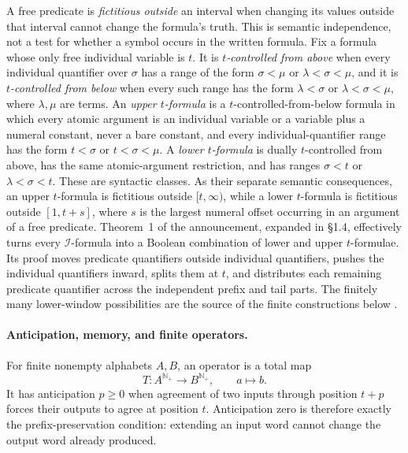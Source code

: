 A free predicate is \emph{fictitious outside} an interval when changing its
values outside that interval cannot change the formula's truth.  This is
semantic independence, not a test for whether a symbol occurs in the written
formula.  Fix a formula whose only free individual variable is \(t\).  It is
\emph{\(t\)-controlled from above} when every individual quantifier over
\(\sigma\) has a range of the form
\(\sigma<\mu\) or \(\lambda<\sigma<\mu\), and it is
\emph{\(t\)-controlled from below} when every such range has the form
\(\lambda<\sigma\) or \(\lambda<\sigma<\mu\), where \(\lambda,\mu\) are
terms.  An \emph{upper \(t\)-formula} is a \(t\)-controlled-from-below formula
in which every atomic argument is an individual variable or a variable plus a
numeral constant, never a bare constant, and every individual-quantifier range
has the form \(t<\sigma\) or \(t<\sigma<\mu\).  A
\emph{lower \(t\)-formula} is dually \(t\)-controlled from above, has the same
atomic-argument restriction, and has ranges
\(\sigma<t\) or \(\lambda<\sigma<t\).  These are syntactic classes.  As their
separate semantic consequences, an upper \(t\)-formula is fictitious outside
\([t,\infty)\), while a lower \(t\)-formula is fictitious outside
\([1,t+s]\), where \(s\) is the largest numeral offset occurring in an
argument of a free predicate.  Theorem~1 of the announcement, expanded in
\S1.4, effectively turns every \(\mathcal I\)-formula into a Boolean
combination of lower and upper \(t\)-formulae.  Its proof moves predicate
quantifiers outside individual quantifiers, pushes the individual quantifiers
inward, splits them at \(t\), and distributes each remaining predicate
quantifier across the independent prefix and tail parts.  The finitely many
lower-window possibilities are the source of the finite constructions below
\cite[pp.~326--327]{Trakhtenbrot1961}
\cite[pp.~103--109]{Trakhtenbrot1962Expanded}.

\paragraph{Anticipation, memory, and finite operators.}
For finite nonempty alphabets \(A,B\), an operator is a total map
\[
  T:A^{\mathbb N_{+}}\longrightarrow B^{\mathbb N_{+}},
  \qquad a\longmapsto b.
\]
It has anticipation \(p\geq0\) when agreement of two inputs through position
\(t+p\) forces their outputs to agree at position \(t\).  Anticipation zero is
therefore exactly the prefix-preservation condition: extending an input word
cannot change the output word already produced.

